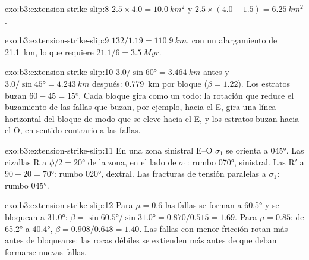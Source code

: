 \begin{solution}{exo:b3:extension-strike-slip:8}
$2.5\times4.0 = \qty{10.0}{km^2}$ y $2.5\times(4.0 - 1.5) =
\qty{6.25}{km^2}$.
\end{solution}

\begin{solution}{exo:b3:extension-strike-slip:9}
$132/1.19 = \qty{110.9}{km}$, con un alargamiento de \qty{21.1}{km}, lo que requiere
$21.1/6 = \qty{3.5}{Myr}$.
\end{solution}

\begin{solution}{exo:b3:extension-strike-slip:10}
$3.0/\sin\ang{60} = \qty{3.464}{km}$ antes y $3.0/\sin\ang{45} =
\qty{4.243}{km}$ después: \qty{0.779}{km} por bloque ($\beta = 1.22$). Los estratos
buzan $60 - 45 = \ang{15}$. Cada bloque gira como un todo: la rotación que
reduce el buzamiento de las fallas que buzan, por ejemplo, hacia el E, gira una línea horizontal del
bloque de modo que se eleve hacia el E, y los estratos buzan hacia el O, en sentido contrario a las
fallas.
\end{solution}

\begin{solution}{exo:b3:extension-strike-slip:11}
En una zona sinistral E--O $\sigma_1$ se orienta a \ang{045}. Las cizallas R a
$\phi/2 = \ang{20}$ de la zona, en el lado de $\sigma_1$: rumbo \ang{070},
sinistral. Las R$'$ a $90 - 20 = \ang{70}$: rumbo \ang{020}, dextral. Las fracturas de tensión
paralelas a $\sigma_1$: rumbo \ang{045}.
\end{solution}

\begin{solution}{exo:b3:extension-strike-slip:12}
Para $\mu = 0.6$ las fallas se forman a \ang{60.5} y se bloquean a \ang{31.0}: $\beta =
\sin\ang{60.5}/\sin\ang{31.0} = 0.870/0.515 = 1.69$. Para $\mu = 0.85$: de
\ang{65.2} a \ang{40.4}, $\beta = 0.908/0.648 = 1.40$. Las fallas con menor
fricción rotan más antes de bloquearse: las rocas débiles se extienden más antes de que
deban formarse nuevas fallas.
\end{solution}

